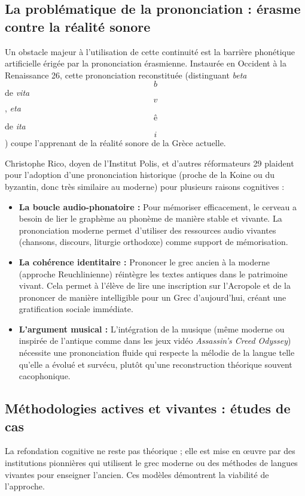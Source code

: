 \subsection{La problématique de la prononciation : érasme contre la réalité sonore}

Un obstacle majeur à l'utilisation de cette continuité est la barrière phonétique artificielle
érigée par la prononciation érasmienne. Instaurée en Occident à la Renaissance 26, cette
prononciation reconstituée (distinguant \textit{beta} \[b\] de \textit{vita} \[v\], \textit{eta}
\[ê\] de \textit{ita} \[i\]) coupe l'apprenant de la réalité sonore de la Grèce
actuelle.\cite{ref28}

Christophe Rico, doyen de l'Institut Polis, et d'autres réformateurs 29 plaident pour l'adoption
d'une prononciation historique (proche de la Koine ou du byzantin, donc très similaire au moderne)
pour plusieurs raisons cognitives :

\begin{itemize}\item \textbf{La boucle audio-phonatoire :} Pour mémoriser efficacement, le cerveau a besoin de lier le graphème au phonème de manière stable et vivante. La prononciation moderne permet d'utiliser des ressources audio vivantes (chansons, discours, liturgie orthodoxe) comme support de mémorisation.\cite{ref20}\item \textbf{La cohérence identitaire :} Prononcer le grec ancien \og à la moderne\fg{} (approche Reuchlinienne) réintègre les textes antiques dans le patrimoine vivant. Cela permet à l'élève de lire une inscription sur l'Acropole et de la prononcer de manière intelligible pour un Grec d'aujourd'hui, créant une gratification sociale immédiate.\cite{ref15}\item \textbf{L'argument musical :} L'intégration de la musique (même moderne ou inspirée de l'antique comme dans les jeux vidéo \textit{Assassin's Creed Odyssey}) nécessite une prononciation fluide qui respecte la mélodie de la langue telle qu'elle a évolué et survécu, plutôt qu'une reconstruction théorique souvent cacophonique.\cite{ref32}\end{itemize}

\subsection{Méthodologies actives et vivantes : études de cas}

La refondation cognitive ne reste pas théorique ; elle est mise en œuvre par des institutions
pionnières qui utilisent le grec moderne ou des méthodes de \og langues vivantes\fg{} pour enseigner
l'ancien. Ces modèles démontrent la viabilité de l'approche.



